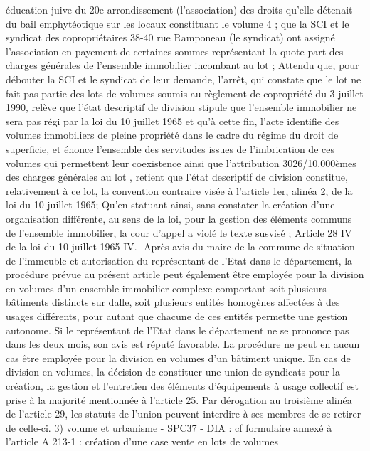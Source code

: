 \documentclass[11pt,a4paper]{report}
\begin{document}
	éducation juive du 20e arrondissement (l'association) des droits qu'elle détenait du bail emphytéotique sur les
	locaux constituant le volume 4 ; que la SCI et le syndicat des copropriétaires 38-40 rue Ramponeau (le syndicat)
	ont assigné l'association en payement de certaines sommes représentant la quote part des charges générales de
	l'ensemble immobilier incombant au lot  ;
	Attendu que, pour débouter la SCI et le syndicat de leur demande, l'arrêt, qui constate que le lot  ne fait pas
	partie des lots de volumes soumis au règlement de copropriété du 3 juillet 1990, relève que l'état descriptif de
	division stipule que l'ensemble immobilier ne sera pas régi par la loi du 10 juillet 1965 et qu'à cette fin, l'acte
	identifie des volumes immobiliers de pleine propriété dans le cadre du régime du droit de superficie, et énonce
	l'ensemble des servitudes issues de l'imbrication de ces volumes qui permettent leur coexistence ainsi que
	l'attribution 3026/10.000èmes des charges générales au lot , retient que l'état descriptif de division
	constitue, relativement à ce lot, la convention contraire visée à l'article 1er, alinéa 2, de la loi du 10 juillet 1965;
	Qu'en statuant ainsi, sans constater la création d'une organisation différente, au sens de la loi, pour la gestion
	des éléments communs de l'ensemble immobilier, la cour d'appel a violé le texte susvisé ;
	Article 28 IV de la loi du 10 juillet 1965
	IV.- Après avis du maire de la commune de situation de l'immeuble et autorisation du représentant de l'Etat dans
	le département, la procédure prévue au présent article peut également être employée pour la division en volumes
	d'un ensemble immobilier complexe comportant soit plusieurs bâtiments distincts sur dalle, soit plusieurs entités
	homogènes affectées à des usages différents, pour autant que chacune de ces entités permette une gestion
	autonome. Si le représentant de l'Etat dans le département ne se prononce pas dans les deux mois, son avis est
	réputé favorable.
	La procédure ne peut en aucun cas être employée pour la division en volumes d'un bâtiment unique.
	En cas de division en volumes, la décision de constituer une union de syndicats pour la création, la gestion et
	l'entretien des éléments d'équipements à usage collectif est prise à la majorité mentionnée à l'article 25.
	Par dérogation au troisième alinéa de l'article 29, les statuts de l'union peuvent interdire à ses membres de se
	retirer de celle-ci.
	3) volume et urbanisme
	- SPC37
	- DIA : cf formulaire annexé à l’article A 213-1 : création d’une case vente en lots de volumes
\end{document}
